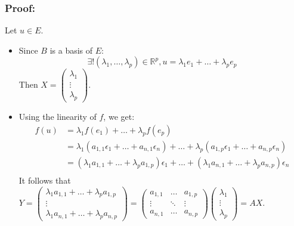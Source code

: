 \documentclass[notitlepage]{math}
\begin{document}
\subsubsection{Proof:}
Let $u \in E$.
\begin{itemize}
    \item Since $B$ is a basis of $E$:
    \[\exists ! (\lambda_1, \dots , \lambda_p) \in \mathbb{R}^p, u = \lambda_1 e_1 + \dots + \lambda_p e_p\]
    Then $X = \begin{pmatrix} \lambda_1 \\ \vdots \\ \lambda_p \end{pmatrix}$.
    \item Using the linearity of $f$, we get:
    \begin{align*}
        f(u) &= \lambda_1 f(e_1) + \dots + \lambda_p f(e_p) \\
        &= \lambda_1 (a_{1,1} \epsilon_1 + \dots + a_{n,1} \epsilon_n) + \dots + \lambda_p (a_{1,p} \epsilon_1 + \dots + a_{n,p} \epsilon_n) \\
        &= (\lambda_1 a_{1,1} + \dots + \lambda_p a_{1,p}) \epsilon_1 + \dots + (\lambda_1 a_{n,1} + \dots + \lambda_p a_{n,p}) \epsilon_n \\
    \end{align*}
    It follows that $Y = \begin{pmatrix} \lambda_1 a_{1,1} + \dots + \lambda_p a_{1,p} \\ \vdots \\ \lambda_1 a_{n,1} + \dots + \lambda_p a_{n,p} \end{pmatrix} = 
    \begin{pmatrix} a_{1,1} & \dots & a_{1,p} \\ \vdots & \ddots & \vdots \\ a_{n,1} & \dots & a_{n,p} \end{pmatrix}
    \begin{pmatrix} \lambda_1 \\ \vdots \\ \lambda_p \end{pmatrix} = AX$.
\end{itemize}
\end{document}

